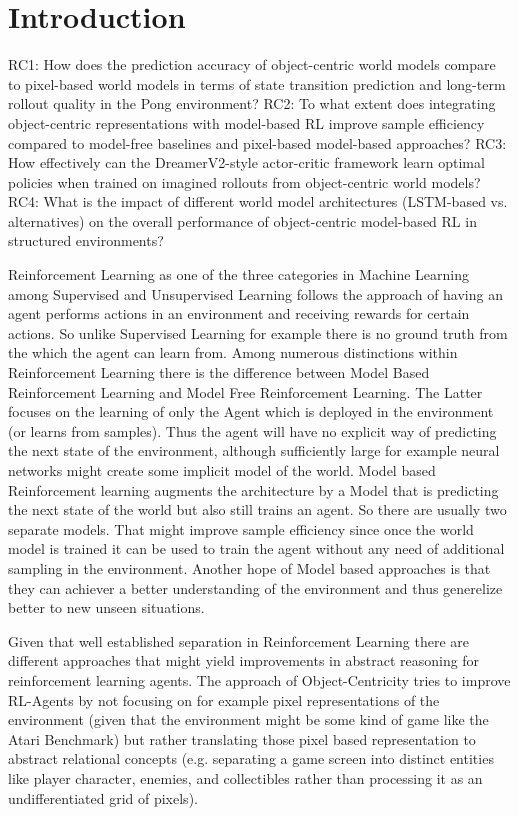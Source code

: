 \documentclass[
	english,
	ruledheaders=section,
	class=report,
	thesis={type=master},
	accentcolor=9c,
	custommargins=true,
	marginpar=false,
	parskip=half-,
	fontsize=11pt,
]{tudapub}
\begin{document}
\chapter{Introduction}
\label{chap:introduction}
RC1: How does the prediction accuracy of object-centric world models compare to pixel-based world models in terms of state transition 
prediction and long-term rollout quality in the Pong environment?
RC2: To what extent does integrating object-centric representations with model-based RL improve sample efficiency compared to model-free baselines
 and pixel-based model-based approaches?
RC3: How effectively can the DreamerV2-style actor-critic framework learn optimal policies when trained on imagined rollouts from object-centric world models?
RC4: What is the impact of different world model architectures (LSTM-based vs. alternatives) on the overall performance of object-centric model-based RL in structured environments?


Reinforcement Learning as one of the three categories in Machine Learning among Supervised and Unsupervised Learning follows the approach of having an agent performs actions in an environment and receiving rewards
for certain actions. So unlike Supervised Learning for example there is no ground truth from the which the agent can learn from. Among numerous distinctions within Reinforcement Learning there is the difference 
between Model Based Reinforcement Learning and Model Free Reinforcement Learning. The Latter focuses on the learning of only the Agent which is deployed in the environment (or learns from samples). Thus the agent
will have no explicit way of predicting the next state of the environment, although sufficiently large for example neural networks might create some implicit model of the world. Model based Reinforcement learning 
augments the architecture by a Model that is predicting the next state of the world but also still trains an agent. So there are usually two separate models. That might improve sample efficiency since once the world model
is trained it can be used to train the agent without any need of additional sampling in the environment. Another hope of Model based approaches is that they can achiever a better understanding of the environment and thus
generelize better to new unseen situations.

Given that well established separation in Reinforcement Learning there are different approaches that might yield improvements in abstract reasoning for reinforcement learning agents. The approach of Object-Centricity tries to
improve RL-Agents by not focusing on for example pixel representations of the environment (given that the environment might be some kind of game like the Atari Benchmark) but rather translating those pixel based representation
to abstract relational concepts (e.g. separating a game screen into distinct entities like player character, enemies, and collectibles rather than processing it as an undifferentiated grid of pixels).
\end{document}
